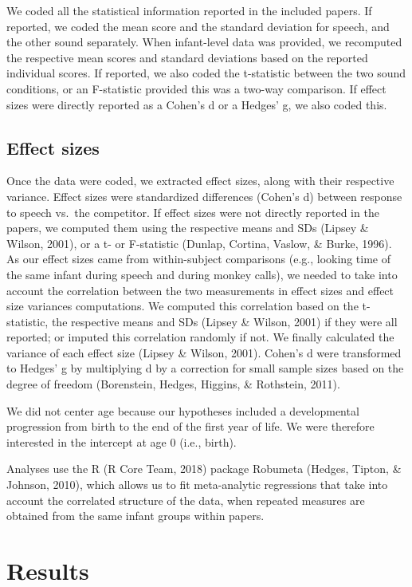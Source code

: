 \documentclass[
  man]{apa6}
\begin{document}
We coded all the statistical information reported in the included papers. If reported, we coded the mean score and the standard deviation for speech, and the other sound separately. When infant-level data was provided, we recomputed the respective mean scores and standard deviations based on the reported individual scores. If reported, we also coded the t-statistic between the two sound conditions, or an F-statistic provided this was a two-way comparison. If effect sizes were directly reported as a Cohen's d or a Hedges' g, we also coded this.

\hypertarget{effect-sizes}{%
\subsection{Effect sizes}\label{effect-sizes}}

Once the data were coded, we extracted effect sizes, along with their respective variance. Effect sizes were standardized differences (Cohen's d) between response to speech vs.~the competitor.
If effect sizes were not directly reported in the papers, we computed them using the respective means and SDs (Lipsey \& Wilson, 2001), or a t- or F-statistic (Dunlap, Cortina, Vaslow, \& Burke, 1996). As our effect sizes came from within-subject comparisons (e.g., looking time of the same infant during speech and during monkey calls), we needed to take into account the correlation between the two measurements in effect sizes and effect size variances computations. We computed this correlation based on the t-statistic, the respective means and SDs (Lipsey \& Wilson, 2001) if they were all reported; or imputed this correlation randomly if not. We finally calculated the variance of each effect size (Lipsey \& Wilson, 2001). Cohen's d were transformed to Hedges' g by multiplying d by a correction for small sample sizes based on the degree of freedom (Borenstein, Hedges, Higgins, \& Rothstein, 2011).

We did not center age because our hypotheses included a developmental progression from birth to the end of the first year of life. We were therefore interested in the intercept at age 0 (i.e., birth).

Analyses use the R (R Core Team, 2018) package Robumeta (Hedges, Tipton, \& Johnson, 2010), which allows us to fit meta-analytic regressions that take into account the correlated structure of the data, when repeated measures are obtained from the same infant groups within papers.

\hypertarget{results}{%
\section{Results}\label{results}}
\end{document}
